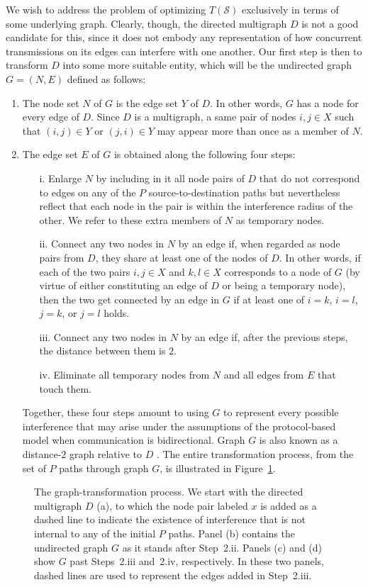 \documentclass{article}
\begin{document}
We wish to address the problem of optimizing $T(\mathcal{S})$ exclusively in
terms of some underlying graph. Clearly, though, the directed multigraph $D$ is
not a good candidate for this, since it does not embody any representation of
how concurrent transmissions on its edges can interfere with one another. Our
first step is then to transform $D$ into some more suitable entity, which will
be the undirected graph $G=(N,E)$ defined as follows:
\begin{enumerate}
\item The node set $N$ of $G$ is the edge set $Y$ of $D$. In other words, $G$
has a node for every edge of $D$. Since $D$ is a multigraph, a same pair of
nodes $i,j\in X$ such that $(i,j)\in Y$ or $(j,i)\in Y$ may appear more than
once as a member of $N$.
\item The edge set $E$ of $G$ is obtained along the following four steps:
\begin{enumerate}
\item[i.] Enlarge $N$ by including in it all node pairs of $D$ that do not
correspond to edges on any of the $P$ source-to-destination paths but
nevertheless reflect that each node in the pair is within the interference
radius of the other. We refer to these extra members of $N$ as temporary nodes.
\item[ii.] Connect any two nodes in $N$ by an edge if, when regarded as node
pairs from $D$, they share at least one of the nodes of $D$. In other words, if
each of the two pairs $i,j\in X$ and $k,l\in X$ corresponds to a node of $G$ (by
virtue of either constituting an edge of $D$ or being a temporary node), then
the two get connected by an edge in $G$ if at least one of $i=k$, $i=l$, $j=k$,
or $j=l$ holds.
\item[iii.] Connect any two nodes in $N$ by an edge if, after the previous
steps, the distance between them is $2$.
\item[iv.] Eliminate all temporary nodes from $N$ and all edges from $E$ that
touch them.
\end{enumerate}
Together, these four steps amount to using $G$ to represent every possible
interference that may arise under the assumptions of the protocol-based model
when communication is bidirectional. Graph $G$ is also known as a distance-$2$
graph relative to $D$ \cite{bbkmt04}. The entire transformation process, from
the set of $P$ paths through graph $G$, is illustrated in Figure~\ref{fig3}.
\end{enumerate}

\begin{figure}[t]
\centering
{}
\caption{The graph-transformation process. We start with the directed multigraph
$D$ (a), to which the node pair labeled $x$ is added as a dashed line to
indicate the existence of interference that is not internal to any of the
initial $P$ paths. Panel (b) contains the undirected graph $G$ as it stands
after Step~2.ii. Panels (c) and (d) show $G$ past Steps~2.iii and~2.iv,
respectively. In these two panels, dashed lines are used to represent the edges
added in Step~2.iii.}
\label{fig3}
\end{figure}
\end{document}
